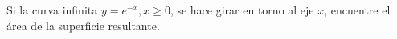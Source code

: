 \item Si la curva infinita $y = e^{-x}, x \ge 0$, se hace girar en torno al eje $x$, encuentre el área de la superficie resultante.
